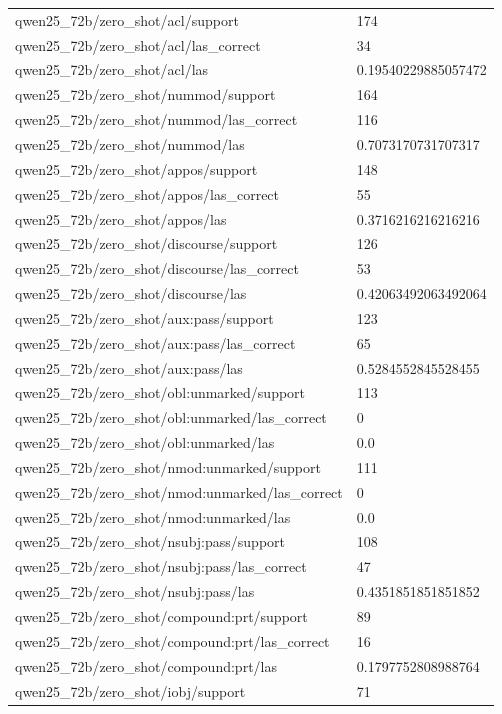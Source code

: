 \begin{tabular}{ll}
qwen25\_72b/zero\_shot/acl/support & 174 \\
qwen25\_72b/zero\_shot/acl/las\_correct & 34 \\
qwen25\_72b/zero\_shot/acl/las & 0.19540229885057472 \\
qwen25\_72b/zero\_shot/nummod/support & 164 \\
qwen25\_72b/zero\_shot/nummod/las\_correct & 116 \\
qwen25\_72b/zero\_shot/nummod/las & 0.7073170731707317 \\
qwen25\_72b/zero\_shot/appos/support & 148 \\
qwen25\_72b/zero\_shot/appos/las\_correct & 55 \\
qwen25\_72b/zero\_shot/appos/las & 0.3716216216216216 \\
qwen25\_72b/zero\_shot/discourse/support & 126 \\
qwen25\_72b/zero\_shot/discourse/las\_correct & 53 \\
qwen25\_72b/zero\_shot/discourse/las & 0.42063492063492064 \\
qwen25\_72b/zero\_shot/aux:pass/support & 123 \\
qwen25\_72b/zero\_shot/aux:pass/las\_correct & 65 \\
qwen25\_72b/zero\_shot/aux:pass/las & 0.5284552845528455 \\
qwen25\_72b/zero\_shot/obl:unmarked/support & 113 \\
qwen25\_72b/zero\_shot/obl:unmarked/las\_correct & 0 \\
qwen25\_72b/zero\_shot/obl:unmarked/las & 0.0 \\
qwen25\_72b/zero\_shot/nmod:unmarked/support & 111 \\
qwen25\_72b/zero\_shot/nmod:unmarked/las\_correct & 0 \\
qwen25\_72b/zero\_shot/nmod:unmarked/las & 0.0 \\
qwen25\_72b/zero\_shot/nsubj:pass/support & 108 \\
qwen25\_72b/zero\_shot/nsubj:pass/las\_correct & 47 \\
qwen25\_72b/zero\_shot/nsubj:pass/las & 0.4351851851851852 \\
qwen25\_72b/zero\_shot/compound:prt/support & 89 \\
qwen25\_72b/zero\_shot/compound:prt/las\_correct & 16 \\
qwen25\_72b/zero\_shot/compound:prt/las & 0.1797752808988764 \\
qwen25\_72b/zero\_shot/iobj/support & 71 \\

\end{tabular}
